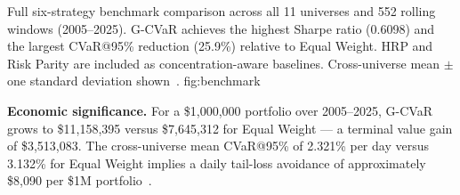 \begin{table}[htbp]
\centering
\caption{Six-strategy benchmark comparison (Table~9B): mean $\pm$ std
         across all 11 universes, 552 windows.
         HRP~\citep{lopezdeprado2016} and Risk
         Parity~\citep{maillard2010} included as concentration-aware
         baselines. G-CVaR achieves the strongest CVaR@95\% reduction
         and the highest Sharpe.}
\label{tab:perf_all}
\end{table}

  {Full six-strategy benchmark comparison across all 11 universes
   and 552 rolling windows (2005--2025). G-CVaR achieves the highest
   Sharpe ratio (0.6098) and the largest CVaR@95\% reduction (25.9\%)
   relative to Equal Weight. HRP and Risk Parity are included as
   concentration-aware baselines. Cross-universe mean $\pm$ one
   standard deviation shown~\citep{lopezdeprado2016,maillard2010}.}
  {fig:benchmark}

\textbf{Economic significance.} For a \$1,000,000 portfolio over
2005--2025, G-CVaR grows to \$11,158,395 versus \$7,645,312 for Equal
Weight — a terminal value gain of \$3,513,083. The cross-universe mean
CVaR@95\% of 2.321\% per day versus 3.132\% for Equal Weight implies a
daily tail-loss avoidance of approximately \$8,090 per \$1M
portfolio~\citep{harvey2016,bailey2012}.

